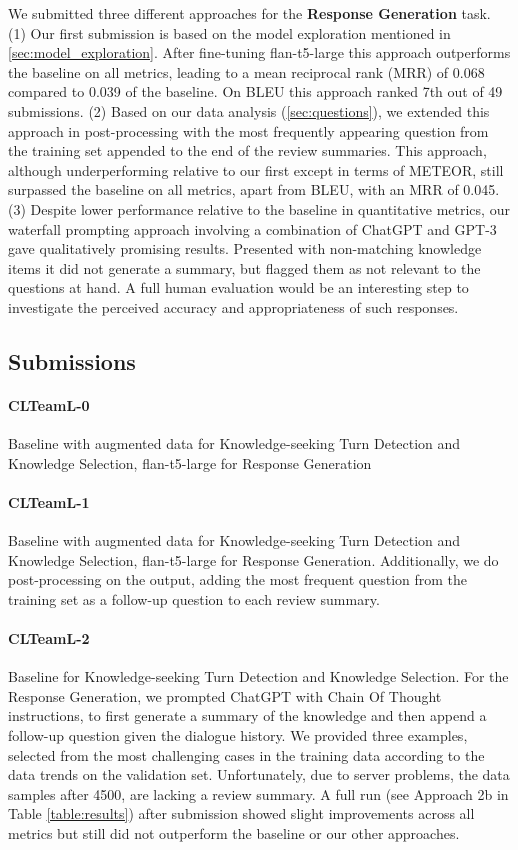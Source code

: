 \documentclass[11pt]{article}
\begin{document}
We submitted three different approaches for the \textbf{Response Generation} task. (1) Our first submission is based on the model exploration mentioned in \ref{sec:model_exploration}. After fine-tuning flan-t5-large this approach outperforms the baseline on all metrics, leading to a mean reciprocal rank (MRR) of 0.068 compared to 0.039 of the baseline. On BLEU this approach ranked 7th out of 49 submissions.
(2) Based on our data analysis (\ref{sec:questions}), we extended this approach in post-processing with the most frequently appearing question from the training set appended to the end of the review summaries. This approach, although underperforming relative to our first except in terms of METEOR, still surpassed the baseline on all metrics, apart from BLEU, with an MRR of 0.045.
(3) Despite lower performance relative to the baseline in quantitative metrics, our waterfall prompting approach involving a combination of ChatGPT and GPT-3 gave qualitatively promising results. Presented with non-matching knowledge items it did not generate a summary, but flagged them as not relevant to the questions at hand. A full human evaluation would be an interesting step to investigate the perceived accuracy and appropriateness of such responses.



\subsection{Submissions}
\paragraph{CLTeamL-0} Baseline with augmented data for Knowledge-seeking Turn Detection and Knowledge Selection, flan-t5-large for Response Generation %

\paragraph{CLTeamL-1} Baseline with augmented data for Knowledge-seeking Turn Detection and Knowledge Selection, flan-t5-large for Response Generation. Additionally, we do post-processing on the output, adding the most frequent question from the training set as a follow-up question to each review summary. %

\paragraph{CLTeamL-2} Baseline for Knowledge-seeking Turn Detection and Knowledge Selection. For the Response Generation, we prompted ChatGPT with Chain Of Thought instructions, to first generate a summary of the knowledge and then append a follow-up question given the dialogue history. We provided three examples, selected from the most challenging cases in the training data according to the data trends on the validation set. Unfortunately, due to server problems, the data samples after 4500, are lacking a review summary. A full run (see Approach 2b in Table \ref{table:results}) after submission showed slight improvements across all metrics but still did not outperform the baseline or our other approaches. %
\end{document}
